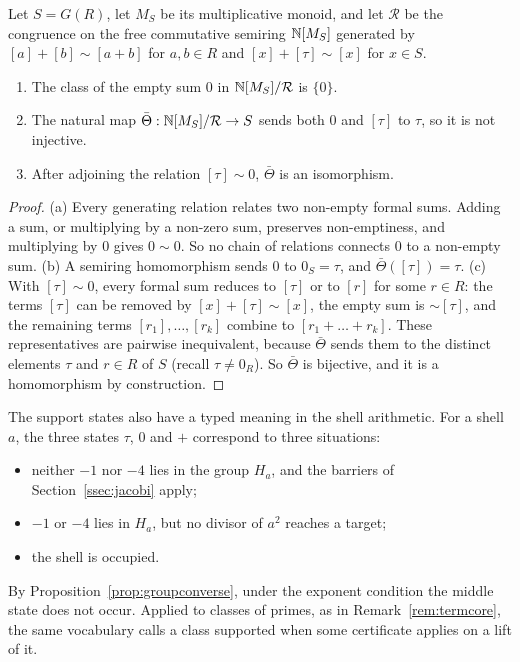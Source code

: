 \begin{proposition}\label{prop:dossier}
Let $S=G(R)$, let $M_S$ be its multiplicative monoid, and let $\mathcal R$ be the congruence on the free commutative semiring $\mathbb{N}[M_S]$ generated by $[a]+[b]\sim[a+b]$ for $a,b\in R$ and $[x]+[\tau]\sim[x]$ for $x\in S$.
\begin{enumerate}[label=(\alph*)]
\item The class of the empty sum $0$ in $\mathbb{N}[M_S]/\mathcal R$ is $\{0\}$.
\item The natural map $\bar\Theta:\mathbb{N}[M_S]/\mathcal R\to S$ sends both $0$ and $[\tau]$ to $\tau$, so it is not injective.
\item After adjoining the relation $[\tau]\sim0$, $\bar\Theta$ is an isomorphism.
\end{enumerate}
\end{proposition}
\begin{proof}
(a) Every generating relation relates two non-empty formal sums. Adding a sum, or multiplying by a non-zero sum, preserves non-emptiness, and multiplying by $0$ gives $0\sim0$. So no chain of relations connects $0$ to a non-empty sum.
(b) A semiring homomorphism sends $0$ to $0_S=\tau$, and $\bar\Theta([\tau])=\tau$.
(c) With $[\tau]\sim0$, every formal sum reduces to $[\tau]$ or to $[r]$ for some $r\in R$: the terms $[\tau]$ can be removed by $[x]+[\tau]\sim[x]$, the empty sum is $\sim[\tau]$, and the remaining terms $[r_1],\dots,[r_k]$ combine to $[r_1+\dots+r_k]$. These representatives are pairwise inequivalent, because $\bar\Theta$ sends them to the distinct elements $\tau$ and $r\in R$ of $S$ (recall $\tau\ne0_R$). So $\bar\Theta$ is bijective, and it is a homomorphism by construction.
\end{proof}

The support states also have a typed meaning in the shell arithmetic. For a shell $a$, the three states $\tau$, $0$ and $+$ correspond to three situations:
\begin{itemize}
\item neither $-1$ nor $-4$ lies in the group $H_a$, and the barriers of Section~\ref{ssec:jacobi} apply;
\item $-1$ or $-4$ lies in $H_a$, but no divisor of $a^2$ reaches a target;
\item the shell is occupied.
\end{itemize}
By Proposition~\ref{prop:groupconverse}, under the exponent condition the middle state does not occur. Applied to classes of primes, as in Remark~\ref{rem:termcore}, the same vocabulary calls a class supported when some certificate applies on a lift of it.

